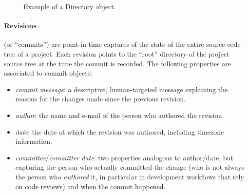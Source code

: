 \begin{figure}%
    \centering
\caption{Example of a Directory object.}
\end{figure}



\begin{figure}\centering
{}
\end{figure}
\paragraph{\textbf{Revisions}} (or ``commits'') are point-in-time captures of
the state of the entire source code tree of a project. Each revision points to
the ``root'' directory of the project source tree at the time the commit is
recorded. The following properties are associated to commit objects:

\begin{itemize}
    \setlength\itemsep{0em}
    \item \emph{commit message}: a descriptive, human-targeted message
        explaining the reasons for the changes made since the previous
        revision.
    \item \emph{author}: the name and e-mail of the person who authored the
        revision.
    \item \emph{date}: the date at which the revision was authored, including
        timezone information.
    \item \emph{committer}/\emph{committer date}: two properties analogous to
        author/date, but capturing the person who actually committed the change
        (who is not always the person who \emph{authored} it, in particular in
        development workflows that rely on code reviews) and when the commit
        happened.
\end{itemize}

